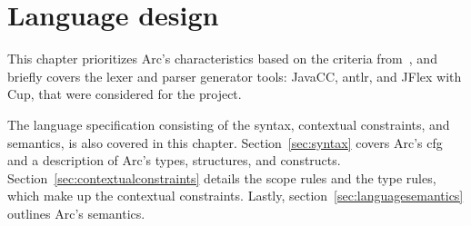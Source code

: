\chapter{Language design}\label{cha:languagedesign}
This chapter prioritizes Arc's characteristics based on the criteria from~\cite{Sebesta2016}, and briefly covers the lexer and parser generator tools: JavaCC, \gls{antlr}, and JFlex with Cup, that were considered for the project.

The language specification consisting of the syntax, contextual constraints, and semantics, is also covered in this chapter. Section~\ref{sec:syntax} covers Arc's \gls{cfg} and a description of Arc's types, structures, and constructs. Section~\ref{sec:contextualconstraints} details the scope rules and the type rules, which make up the contextual constraints. Lastly, section~\ref{sec:languagesemantics} outlines Arc's semantics.






